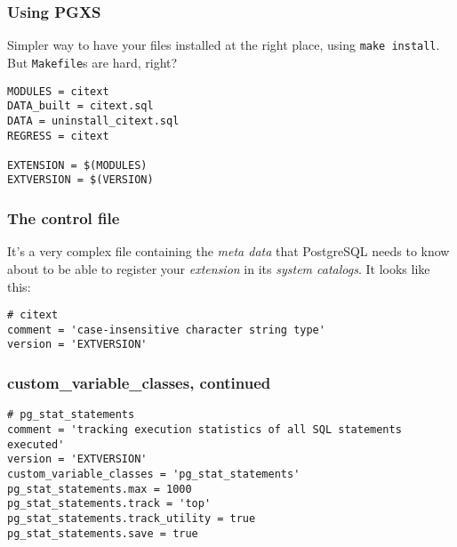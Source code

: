 \documentclass[english]{beamer}
\begin{document}
\begin{frame}[fragile]
  \frametitle{Using PGXS}

  Simpler way to have your files installed at the right place, using
  \texttt{make install}. But \texttt{Makefile}s are hard, right?
  \linebreak

  \begin{example}
\begin{verbatim}
MODULES = citext
DATA_built = citext.sql
DATA = uninstall_citext.sql
REGRESS = citext

EXTENSION = $(MODULES)
EXTVERSION = $(VERSION)
\end{verbatim}
  \end{example}
\end{frame}

\begin{frame}[fragile]
  \frametitle{The control file}

  It's a very complex file containing the \textit{meta data} that PostgreSQL
  needs to know about to be able to register your \textit{extension} in its
  \textit{system catalogs}. It looks like this:
  \linebreak

  \begin{example}
\begin{verbatim}
# citext
comment = 'case-insensitive character string type'
version = 'EXTVERSION'
\end{verbatim}
  \end{example}
\end{frame}


\begin{frame}[fragile]
  \frametitle{custom\_variable\_classes, continued}

  \begin{example}
\begin{verbatim}
# pg_stat_statements
comment = 'tracking execution statistics of all SQL statements executed'
version = 'EXTVERSION'
custom_variable_classes = 'pg_stat_statements'
pg_stat_statements.max = 1000
pg_stat_statements.track = 'top'
pg_stat_statements.track_utility = true
pg_stat_statements.save = true
\end{verbatim}
  \end{example}
\end{frame}
\end{document}
